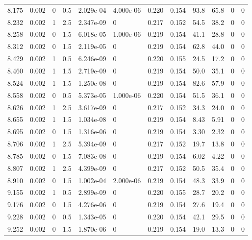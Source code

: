 \documentclass[preview]{standalone}
\begin{document}
{{{{\begin{tabular}{L{1.2cm}C{1.2cm} C{0.3cm}C{0.5cm} C{1.4cm}C{1.4cm} C{1.4cm}C{1.4cm} C{1.6cm}C{1.6cm} C{1.6cm}C{1.6cm}}
  8.175  &  0.002  & 0     & 0.5 &  2.029e-04  & 4.000e-06  &  0.220&   0.154& 93.8 & 65.8   &  0 & 0  \\ 
  8.232  &  0.002  & 1     & 2.5 &  2.347e-09  & 0  &  0.217&   0.152& 54.5 & 38.2   &  0 & 0  \\ 
  8.258  &  0.002  & 0     & 1.5 &  6.018e-05  & 1.000e-06  &  0.219&   0.154& 41.1 & 28.8   &  0 & 0  \\ 
  8.312  &  0.002  & 0     & 1.5 &  2.119e-05  & 0  &  0.219&   0.154& 62.8 & 44.0   &  0 & 0  \\ 
  8.429  &  0.002  & 1     & 0.5 &  6.246e-09  & 0  &  0.220&   0.155& 24.5 & 17.2   &  0 & 0  \\ 
  8.460  &  0.002  & 1     & 1.5 &  2.719e-09  & 0  &  0.219&   0.154& 50.0 & 35.1   &  0 & 0  \\ 
  8.524  &  0.002  & 1     & 1.5 &  1.250e-08  & 0  &  0.219&   0.154& 82.6 & 57.9   &  0 & 0  \\ 
  8.558  &  0.002  & 0     & 0.5 &  5.373e-05  & 1.000e-06  &  0.220&   0.154& 51.5 & 36.1   &  0 & 0  \\ 
  8.626  &  0.002  & 1     & 2.5 &  3.617e-09  & 0  &  0.217&   0.152& 34.3 & 24.0   &  0 & 0  \\ 
  8.655  &  0.002  & 1     & 1.5 &  1.034e-08  & 0  &  0.219&   0.154& 8.43 & 5.91   &  0 & 0  \\ 
  8.695  &  0.002  & 0     & 1.5 &  1.316e-06  & 0  &  0.219&   0.154& 3.30 & 2.32   &  0 & 0  \\ 
  8.706  &  0.002  & 1     & 2.5 &  5.394e-09  & 0  &  0.217&   0.152& 19.7 & 13.8   &  0 & 0  \\ 
  8.785  &  0.002  & 0     & 1.5 &  7.083e-08  & 0  &  0.219&   0.154& 6.02 & 4.22   &  0 & 0  \\ 
  8.807  &  0.002  & 1     & 2.5 &  4.399e-09  & 0  &  0.217&   0.152& 50.5 & 35.4   &  0 & 0  \\ 
  8.910  &  0.002  & 0     & 1.5 &  1.002e-04  & 2.000e-06  &  0.219&   0.154& 48.3 & 33.9   &  0 & 0  \\ 
  9.155  &  0.002  & 1     & 0.5 &  2.899e-09  & 0  &  0.220&   0.155& 28.7 & 20.2   &  0 & 0  \\ 
  9.176  &  0.002  & 0     & 1.5 &  4.276e-06  & 0  &  0.219&   0.154& 27.6 & 19.4   &  0 & 0  \\ 
  9.228  &  0.002  & 0     & 0.5 &  1.343e-05  & 0  &  0.220&   0.154& 42.1 & 29.5   &  0 & 0  \\ 
  9.252  &  0.002  & 0     & 1.5 &  1.870e-06  & 0  &  0.219&   0.154& 19.0 & 13.3   &  0 & 0  \\ 

\end{tabular}}}}}
\end{document}
